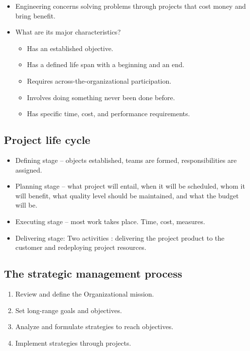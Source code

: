 \documentclass[8pt, letter]{extarticle}
\begin{document}
\begin{multicols}{2}
\begin{itemize}
        \item Engineering concerns solving problems through projects that cost money and bring benefit.
        \item What are its major characteristics?
            \begin{itemize}
                \item Has an established objective.
                \item Has a defined life span with a beginning and an end.
                \item Requires across-the-organizational participation.
                \item Involves doing something never been done before.
                \item Has specific time, cost, and performance requirements.
            \end{itemize}
    \end{itemize}

    \subsection{Project life cycle}
    \begin{itemize}
        \item Defining stage – objects established, teams are formed, responsibilities are assigned. 
        \item Planning stage – what project will entail, when it will be scheduled, whom it will benefit, what quality level should be maintained, and what the budget will be. 
        \item Executing stage – most work takes place. Time, cost, measures. 
        \item Delivering stage: Two activities : delivering the project product to the customer and redeploying project resources.
    \end{itemize}

    \subsection{The strategic management process}
    \begin{enumerate}
        \item Review and define the Organizational mission. 
        \item Set long-range goals and objectives. 
        \item Analyze and formulate strategies to reach objectives. 
        \item Implement strategies through projects.
    \end{enumerate}


\end{multicols}
\end{document}
